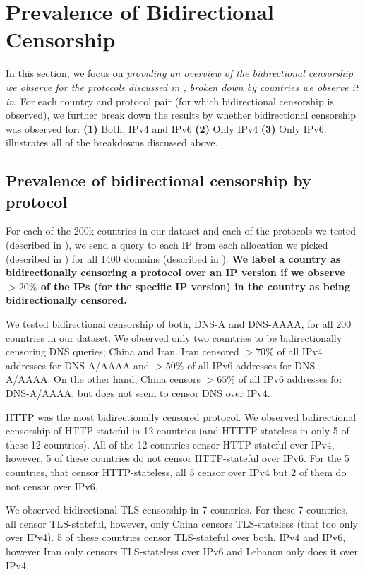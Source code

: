 \section{Prevalence of Bidirectional Censorship}
\PrevalenceGeneral
\label{sec:prevalence}
 In this section, we focus on \emph{providing an overview of the bidirectional censorship we observe for the protocols discussed in , broken down by countries we observe it in}.
For each country and protocol pair (for which bidirectional censorship is observed), we further break down the results by whether bidirectional censorship was observed for:
\textbf{(1)} Both, IPv4 and IPv6
\textbf{(2)} Only IPv4
\textbf{(3)} Only IPv6.
 illustrates all of the breakdowns discussed above.  

\subsection{Prevalence of bidirectional censorship by protocol}
\label{sec:prevalence:proto}
For each of the 200k countries in our dataset and each of the protocols we tested (described in ), we send a query to each IP from each allocation we picked (described in ) for all 1400 domains (described in ). \textbf{We label a country as bidirectionally censoring a protocol over an IP version if we observe $> 20\%$ of the IPs (for the specific IP version) in the country as being bidirectionally censored.}

We tested bidirectional censorship of both, DNS-A and DNS-AAAA, for all 200 countries in our dataset. We observed only two countries to be bidirectionally censoring DNS queries; China and Iran. Iran censored $>70\%$ of all IPv4 addresses for DNS-A/AAAA and $>50\%$ of all IPv6 addresses for DNS-A/AAAA. On the other hand, China censors $>65\%$ of all IPv6 addresses for DNS-A/AAAA, but does not seem to censor DNS over IPv4.  

HTTP was the most bidirectionally censored protocol. We observed bidirectional censorship of HTTP-stateful in 12 countries (and HTTTP-stateless in only 5 of these 12 countries). All of the 12 countries censor HTTP-stateful over IPv4, however, 5 of these countries do not censor HTTP-stateful over IPv6. For the 5 countries, that censor HTTP-stateless, all 5 censor over IPv4 but 2 of them do not censor over IPv6. 

We observed bidirectional TLS censorship in 7 countries. For these 7 countries, all censor TLS-stateful, however, only China censors TLS-stateless (that too only over IPv4). 5 of these countries censor TLS-stateful over both, IPv4 and IPv6, however Iran only censors TLS-stateless over IPv6 and Lebanon only does it over IPv4. 


